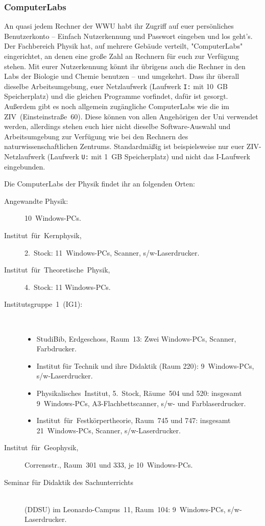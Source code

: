 \begin{multicols}{2}
\subsubsection*{ComputerLabs}
An quasi jedem Rechner der WWU habt ihr Zugriff auf euer persönliches Benutzerkonto -- Einfach Nutzerkennung und Passwort eingeben und los geht's. Der Fachbereich Physik hat, auf mehrere Gebäude verteilt, "ComputerLabs" eingerichtet, an denen eine große Zahl an Rechnern für euch zur Verfügung stehen. Mit eurer Nutzerkennung könnt ihr übrigens auch die Rechner in den Labs der Biologie und Chemie benutzen -- und umgekehrt. Dass ihr überall dieselbe Arbeitsumgebung, euer Netzlaufwerk (Laufwerk \texttt{I:} mit \SI{10}{GB} Speicherplatz) und die gleichen Programme vorfindet, dafür ist gesorgt. Außerdem gibt es noch allgemein zugängliche ComputerLabs wie die im ZIV~(Einsteinstraße~60). Diese können von allen Angehörigen der Uni verwendet werden, allerdings stehen euch hier nicht dieselbe Software-Auswahl und Arbeitsumgebung zur Verfügung wie bei den Rechnern des naturwissenschaftlichen Zentrums. Standardmäßig ist beispielsweise nur euer ZIV-Netzlaufwerk (Laufwerk \texttt{U:} mit \SI{1}{GB} Speicherplatz) und nicht das I-Laufwerk eingebunden.

Die ComputerLabs der Physik findet ihr an folgenden Orten:
\begin{description}
\item[Angewandte Physik:] 10~Windows-PCs.
\item[Institut~für~Kernphysik,] 2.~Stock: 11~Windows-PCs, Scanner, s/w-Laserdrucker.
\item[Institut~für~Theoretische~Physik,] 4.~Stock: 11 Windows-PCs.
\item[Institutsgruppe~1~(IG1):]~
	\begin{itemize}[leftmargin=1mm]
	\item StudiBib, Erdgeschoss, Raum~13: Zwei Windows-PCs, Scanner, Farbdrucker.
	\item Institut für Technik und ihre Didaktik (Raum 220): 9~Windows-PCs, s/w-Laserdrucker.
	\item Physikalisches~Institut, 5.~Stock, Räume~504 und 520: insgesamt 9~Windows-PCs, A3-Flachbettscanner, s/w- und Farblaserdrucker.
	\item Institut~für~Festkörpertheorie, Raum~745 und 747: insgesamt 21~Windows-PCs, Scanner, s/w-Laserdrucker.
	\end{itemize}
\item[Institut~für~Geophysik,] Corrensstr., Raum~301 und 333, je 10~Windows-PCs.
\item[Seminar für Didaktik des Sachunterrichts]~\\(DDSU) im Leonardo-Campus~11, Raum~104: 9~Windows-PCs, s/w-Laserdrucker.
\end{description}


\end{multicols}
